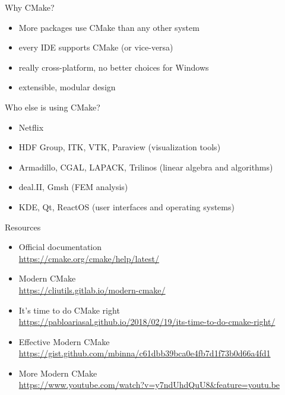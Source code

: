 \documentclass[aspectratio=169,11pt]{beamer}
\begin{document}
\begin{frame}{Why CMake?}
\begin{itemize}
    \item More packages use CMake than any other system
    \item every IDE supports CMake (or vice-versa)
    \item really cross-platform, no better choices for Windows
    \item extensible, modular design
\end{itemize}
\vfill
\pause
Who else is using CMake?
\begin{itemize}
    \item Netflix
    \item HDF Group, ITK, VTK, Paraview (visualization tools)
    \item Armadillo, CGAL, LAPACK, Trilinos (linear algebra and algorithms)
    \item deal.II, Gmsh (FEM analysis)
    \item KDE, Qt, ReactOS (user interfaces and operating systems)
\end{itemize}
\end{frame}

\begin{frame}{Resources}
\begin{itemize}
    \item Official documentation\\
    \url{https://cmake.org/cmake/help/latest/}
    \vfill
    \item Modern CMake\\
    \url{https://cliutils.gitlab.io/modern-cmake/}
    \vfill
    \item{It's time to do CMake right}\\
    \url{https://pabloariasal.github.io/2018/02/19/its-time-to-do-cmake-right/}
    \vfill
    \item Effective Modern CMake\\ \url{https://gist.github.com/mbinna/c61dbb39bca0e4fb7d1f73b0d66a4fd1}
    \vfill
    \item More Modern CMake\\ \url{https://www.youtube.com/watch?v=y7ndUhdQuU8&feature=youtu.be}
\end{itemize}
\end{frame}
\end{document}
